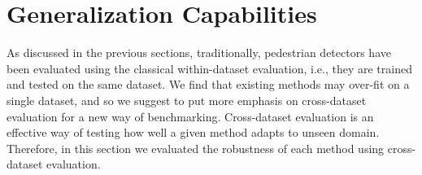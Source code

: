 \documentclass[final]{cvpr}
\begin{document}
\begin{table}[tb]
\centering
 \caption{Benchmarking on autonomous driving datasets.}
  \label{tab:all-evalbench}
\end{table}



%
 \section{Generalization Capabilities} \label{sec:general-cap}
As discussed in the previous sections, traditionally, pedestrian detectors have been evaluated using the classical within-dataset evaluation, i.e., they are trained and tested on the same dataset. We find that existing methods may over-fit on a single dataset, and so we suggest to put more emphasis on cross-dataset evaluation for a new way of benchmarking. Cross-dataset evaluation is an effective way of testing how well a given method adapts to unseen domain. Therefore, in this section we evaluated the robustness of each method using cross-dataset evaluation. 
\end{document}

